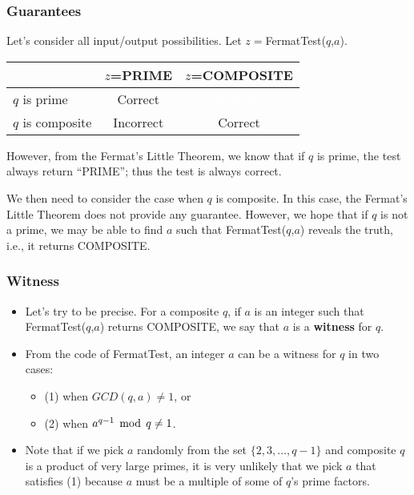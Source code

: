 \begin{frame}\frametitle{Guarantees}
  Let's consider all input/output possibilities.  Let
  $z=$FermatTest($q$,$a$).

  \vspace{0.1in}
  \begin{tabular}{|l|c|c|}
    \hline
    & $z$=PRIME & $z$=COMPOSITE \\
    \hline
    $q$ is prime & Correct & \textcolor{white}{Incorrect} \\
    \hline
    $q$ is composite & Incorrect & Correct \\
    \hline
  \end{tabular}

  \vspace{0.2in} However, from the Fermat's Little Theorem, we
  know that if $q$ is prime, the test always return ``PRIME''; thus
  the test is always correct.

  \pause We then need to consider the case when $q$ is
  composite. \pause In this case, the Fermat's Little Theorem does not
  provide any guarantee. \pause However, we hope that if $q$ is not a
  prime, we may be able to find $a$ such that FermatTest($q$,$a$)
  reveals the truth, i.e., it returns COMPOSITE.
\end{frame}

\begin{frame}\frametitle{Witness}
  \begin{itemize}
  \item 
    Let's try to be precise.  For a composite $q$, if $a$ is an
    integer such that FermatTest($q$,$a$) returns COMPOSITE, we say
    that $a$ is a {\bf witness} for $q$.
  \item
    From the code of FermatTest, an integer $a$ can be a witness for
    $q$ in two cases:
    \begin{itemize}
    \item (1) when $GCD(q,a)\neq 1$, or
    \item (2) when $a^{q-1}\,\bmod\, q\neq 1$.
    \end{itemize}
  \item Note that if we pick $a$ randomly from the set $\{2,3,\ldots,
    q-1\}$ and composite $q$ is a product of very large primes, it is
    very unlikely that we pick $a$ that satisfies (1) because $a$ must
    be a multiple of some of $q$'s prime factors.
  \end{itemize}
\end{frame}

